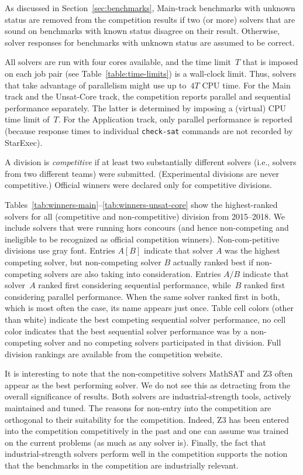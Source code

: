 \documentclass[dvipsnames,table,twoside,11pt]{article}
\begin{document}
As discussed in Section~\ref{sec:benchmarks}, Main-track benchmarks
with unknown status are removed from the competition results if two
(or more) solvers that are sound on benchmarks with known status
disagree on their result.  Otherwise, solver responses for benchmarks
with unknown status are assumed to be correct.

All solvers are run with four cores available, and the time limit~$T$
that is imposed on each job pair (see Table~\ref{table:time-limits})
is a wall-clock limit.  Thus, solvers that take advantage of
parallelism might use up to~$4T$ CPU time.  For the Main track and the
Unsat-Core track, the competition reports parallel and sequential
performance separately.  The latter is determined by imposing a
(virtual) CPU time limit of~$T$.  For the Application track, only
parallel performance is reported (because response times to individual
{\tt check-sat} commands are not recorded by StarExec).

A division is \emph{competitive} if
at least two substantially different solvers (i.e., solvers from two
different teams) were submitted.  (Experimental divisions are never
competitive.)  Official winners were declared only for competitive
divisions.

Tables~\ref{tab:winners-main}--\ref{tab:winners-unsat-core} show the
highest-ranked solvers for all (competitive and non-competitive) division from
2015--2018.
We include solvers that were running hors concours (and hence non-competing
and ineligible to be recognized as official competition winners).
Non-com-petitive divisions use gray font.
Entries $A [B]$ indicate that solver $A$ was the highest competing solver,
but non-competing solver $B$ actually ranked best if non-competing solvers
are also taking into consideration.
Entries
$A/B$ indicate that solver~$A$ ranked first considering sequential
performance, while~$B$ ranked first considering parallel performance.
When the same solver ranked first in both, which is most often the
case, its name appears just once.
Table cell colors (other than white) indicate the best competing sequential
solver performance, no cell color indicates that the best sequential solver
performance was by a non-competing solver and no competing solvers participated
in that division.
Full division rankings are available from the competition website.

It is interesting to note that the non-competitive solvers MathSAT and Z3 often appear as the best performing solver. We do not see this as detracting from the overall significance of results. Both solvers are industrial-strength tools, actively maintained and tuned. The reasons for non-entry into the competition are orthogonal to their suitability for the competition. Indeed, Z3 has been entered into the competition competitively in the past and one can assume was trained on the current problems (as much as any solver is). Finally, the fact that industrial-strength solvers perform well in the competition supports the notion that the benchmarks in the competition are industrially relevant.
\end{document}
